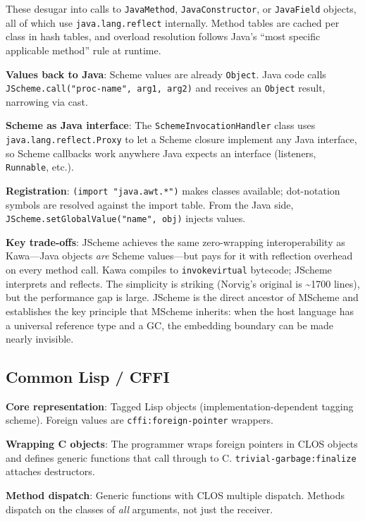 \documentclass[11pt]{article}
\begin{document}
These desugar into calls to \texttt{JavaMethod},
\texttt{JavaConstructor}, or \texttt{JavaField} objects, all of which
use \texttt{java.lang.reflect} internally.  Method tables are cached
per class in hash tables, and overload resolution follows Java's
``most specific applicable method'' rule at runtime.

\textbf{Values back to Java}: Scheme values are already
\texttt{Object}.  Java code calls
\texttt{JScheme.call("proc-name", arg1, arg2)} and receives an
\texttt{Object} result, narrowing via cast.

\textbf{Scheme as Java interface}: The
\texttt{SchemeInvocationHandler} class uses
\texttt{java.lang.reflect.Proxy} to let a Scheme closure implement
any Java interface, so Scheme callbacks work anywhere Java expects an
interface (listeners, \texttt{Runnable}, etc.).

\textbf{Registration}: \texttt{(import "java.awt.*")} makes classes
available; dot-notation symbols are resolved against the import table.
From the Java side, \texttt{JScheme.setGlobalValue("name", obj)}
injects values.

\textbf{Key trade-offs}: JScheme achieves the same zero-wrapping
interoperability as Kawa---Java objects \emph{are} Scheme values---but
pays for it with reflection overhead on every method call.  Kawa
compiles to \texttt{invokevirtual} bytecode; JScheme interprets and
reflects.  The simplicity is striking (Norvig's original is
\textasciitilde1700 lines), but the performance gap is large.  JScheme
is the direct ancestor of MScheme and establishes the key principle
that MScheme inherits: when the host language has a universal reference
type and a GC, the embedding boundary can be made nearly invisible.


\subsection{Common Lisp / CFFI}
\label{sec:cffi}

\textbf{Core representation}: Tagged Lisp objects
(implementation-dependent tagging scheme).  Foreign values are
\texttt{cffi:foreign-pointer} wrappers.

\textbf{Wrapping C objects}: The programmer wraps foreign pointers in
CLOS objects and defines generic functions that call through to C.
\texttt{trivial-garbage:finalize} attaches destructors.

\textbf{Method dispatch}: Generic functions with CLOS multiple
dispatch.  Methods dispatch on the classes of \emph{all} arguments,
not just the receiver.
\end{document}
